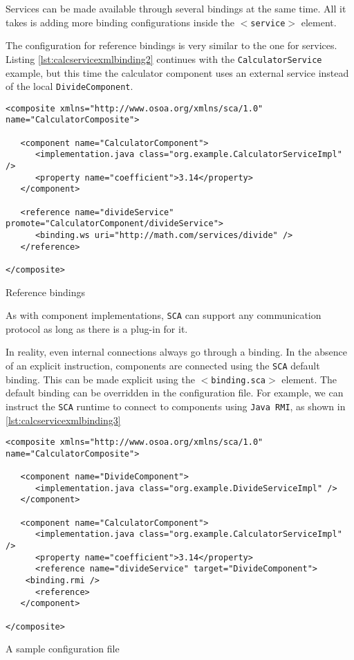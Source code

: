 Services can be made available through several bindings at the same time. All it takes is adding more binding configurations
inside the \texttt{$<$service$>$} element.

The configuration for reference bindings is very similar to the one for services. Listing \ref{lst:calcservicexmlbinding2}
continues with the \texttt{CalculatorService} example, but this time the calculator component uses an external service
instead of the local \texttt{DivideComponent}.

\begin{listing}
\begin{verbatim}
<composite xmlns="http://www.osoa.org/xmlns/sca/1.0" name="CalculatorComposite">

   <component name="CalculatorComponent">
      <implementation.java class="org.example.CalculatorServiceImpl" />
      <property name="coefficient">3.14</property>
   </component>
   
   <reference name="divideService" promote="CalculatorComponent/divideService">
      <binding.ws uri="http://math.com/services/divide" />
   </reference>
   
</composite>
\end{verbatim}
\caption{Reference bindings}
\label{lst:calcservicexmlbinding2}
\end{listing}

As with component implementations, \texttt{SCA} can support any communication protocol as long as there is a plug-in for it.

In reality, even internal connections always go through a binding. In the absence of an explicit instruction, components
are connected using the \texttt{SCA} default binding. This can be made explicit using the \texttt{$<$binding.sca$>$} element.
The default binding can be overridden in the configuration file. For example, we can instruct the \texttt{SCA} runtime to
connect to components using \texttt{Java RMI}, as shown in \ref{lst:calcservicexmlbinding3}

\begin{listing}
\begin{verbatim}
<composite xmlns="http://www.osoa.org/xmlns/sca/1.0" name="CalculatorComposite">

   <component name="DivideComponent">
      <implementation.java class="org.example.DivideServiceImpl" />
   </component>

   <component name="CalculatorComponent">
      <implementation.java class="org.example.CalculatorServiceImpl" />
      <property name="coefficient">3.14</property>
      <reference name="divideService" target="DivideComponent">
	<binding.rmi />
      <reference>
   </component>

</composite>
\end{verbatim}
\caption{A sample configuration file}
\label{lst:calcservicexmlbinding3}
\end{listing}

